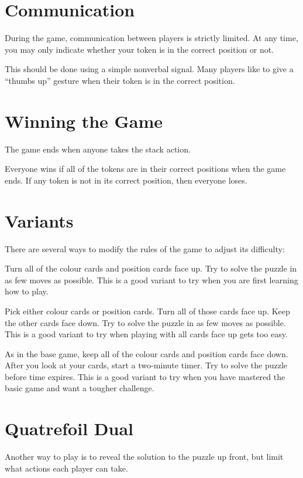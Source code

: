 \documentclass[a6paper, parskip=half, DIV=16, 10pt]{scrartcl}
\begin{document}
\section*{Communication}
During the game, communication between players is strictly limited. At any time, you may only indicate whether your token is in the correct position or not.

This should be done using a simple nonverbal signal. Many players like to give a ``thumbs up'' gesture when their token is in the correct position.%
\newpage
\section*{Winning the Game}
The game ends when anyone takes the stack action.

Everyone wins if all of the tokens are in their correct positions when the game ends. If any token is not in its correct position, then everyone loses.

\section*{Variants}
There are several ways to modify the rules of the game to adjust its difficulty:
\begin{description}[leftmargin=0pt, labelsep=\widthof{\ }]
	\item[Nothing to Hide -] Turn all of the colour cards and position cards face up. Try to solve the puzzle in as few moves as possible. This is a good variant to try when you are first learning how to play.
	\item[Half and Half -] Pick either colour cards or position cards. Turn all of those cards face up. Keep the other cards face down. Try to solve the puzzle in as few moves as possible. This is a good variant to try when playing with all cards face up gets too easy.
	\item[Race the Clock -] As in the base game, keep all of the colour cards and position cards face down. After you look at your cards, start a two-minute timer. Try to solve the puzzle before time expires. This is a good variant to try when you have mastered the basic game and want a tougher challenge.
\end{description}
\newpage
\section*{Quatrefoil Dual}
Another way to play is to reveal the solution to the puzzle up front, but limit what actions each player can take.
\end{document}
